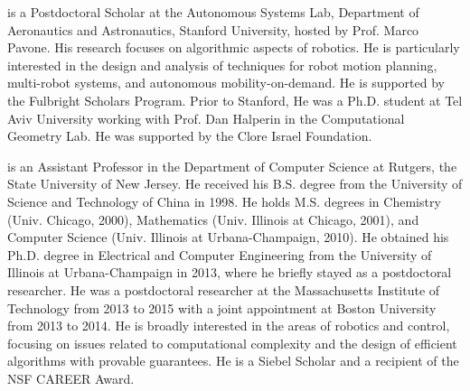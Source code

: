  is a Postdoctoral Scholar at the Autonomous Systems Lab, Department of Aeronautics and Astronautics, Stanford University, hosted by Prof. Marco Pavone. His research focuses on algorithmic aspects of robotics. He is particularly interested in the design and analysis of techniques for robot motion planning, multi-robot systems, and autonomous mobility-on-demand. He is supported by the Fulbright Scholars Program. Prior to Stanford, He was a Ph.D. student at Tel Aviv University working with Prof. Dan Halperin in the Computational Geometry Lab. He was supported by the Clore Israel Foundation.

\vspace{0.2in}

 is an Assistant Professor in the Department of Computer Science at Rutgers, the State University of New Jersey. He received his B.S. degree from the University of Science and Technology of China in 1998. He holds M.S. degrees in Chemistry (Univ. Chicago, 2000), Mathematics (Univ. Illinois at Chicago, 2001), and Computer Science (Univ. Illinois at Urbana-Champaign, 2010). He obtained his Ph.D. degree in Electrical and Computer Engineering from the University of Illinois at Urbana-Champaign in 2013, where he briefly stayed as a postdoctoral researcher. He was a postdoctoral researcher at the Massachusetts Institute of Technology from 2013 to 2015 with a joint appointment at Boston University from 2013 to 2014. He is broadly interested in the areas of robotics and control, focusing on issues related to computational complexity and the design of efficient algorithms with provable guarantees. He is a Siebel Scholar and a recipient of the NSF CAREER Award.

